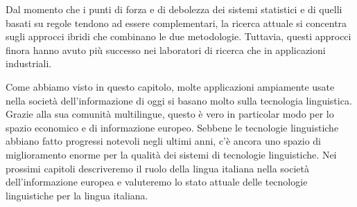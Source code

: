 \begin{multicols}{2}
Dal momento che i punti di forza e di debolezza dei sistemi statistici e di
quelli basati su regole tendono ad essere complementari, la ricerca attuale si
concentra sugli approcci ibridi che combinano le due metodologie. Tuttavia,
questi approcci finora hanno avuto pi\`{u} successo nei laboratori di ricerca
che in applicazioni industriali.


Come abbiamo visto in questo capitolo, molte applicazioni ampiamente usate
nella societ\`{a} dell'informazione di oggi si basano molto sulla tecnologia
linguistica. Grazie alla sua comunit\`{a} multilingue, questo \`{e} vero in
particolar modo per lo spazio economico e di informazione europeo. Sebbene le
tecnologie linguistiche abbiano fatto progressi notevoli negli ultimi anni,
c'\`{e} ancora uno spazio di miglioramento enorme per la qualit\`{a} dei
sistemi di tecnologie linguistiche. Nei prossimi capitoli descriveremo il
ruolo della lingua italiana nella societ\`{a} dell'informazione europea e
valuteremo lo stato attuale delle tecnologie linguistiche per la lingua
italiana.

\end{multicols}

\clearpage



